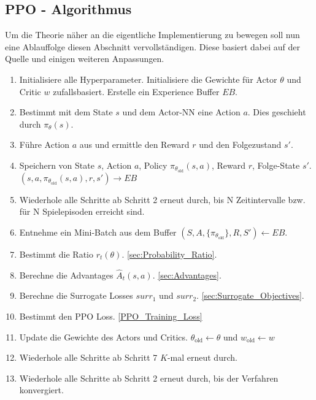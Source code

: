 \subsection{PPO - Algorithmus} \label{sec:PPO_Algorithmus}
Um die Theorie näher an die eigentliche Implementierung zu bewegen soll nun eine Ablauffolge diesen Abschnitt vervollständigen. Diese basiert dabei auf der Quelle \cite{PPO} und einigen weiteren Anpassungen.
\begin{enumerate}
	\item Initialisiere alle Hyperparameter. Initialisiere die Gewichte für Actor $\theta$ und Critic $w$ zufallsbasiert. Erstelle ein Experience Buffer $EB$.
	\item Bestimmt mit dem State $s$ und dem Actor-NN eine Action $a$. Dies geschieht durch $\pi_{\theta}(s)$.
	\item Führe Action $a$ aus und ermittle den Reward $r$ und den Folgezustand $s'$.
	\item Speichern von State $s$, Action $a$, Policy $\pi_{\theta_{\text{old}}}(s,a)$, Reward $r$, Folge-State $s'$. $(s,a, \pi_{\theta_{\text{old}}}(s,a),r,s') \longrightarrow EB$
	\item Wiederhole alle Schritte ab Schritt 2 erneut durch, bis N Zeitintervalle bzw. für N Spielepisoden erreicht sind.
	\item Entnehme ein Mini-Batch aus dem Buffer $(S,A,\{\pi_{\theta_{\text{old}}}\},R,S') \longleftarrow EB$.
	\item Bestimmt die Ratio $r_t(\theta)$. \ref{sec:Probability_Ratio}.
	\item Berechne die Advantages $\hat{A}_{t}(s, a)$. \ref{sec:Advantages}.
	\item Berechne die Surrogate Losses $surr_1$ und $surr_2$. \ref{sec:Surrogate_Objectives}.
	\item Bestimmt den PPO Loss. \ref{PPO_Training_Loss}
	\item Update die Gewichte des Actors und Critics. $\theta_{\text{old}} \longleftarrow \theta$ und $w_{\text{old}} \longleftarrow w$
	\item Wiederhole alle Schritte ab Schritt 7 $K$-mal erneut durch.
	\item Wiederhole alle Schritte ab Schritt 2 erneut durch, bis der Verfahren konvergiert.
\end{enumerate}

